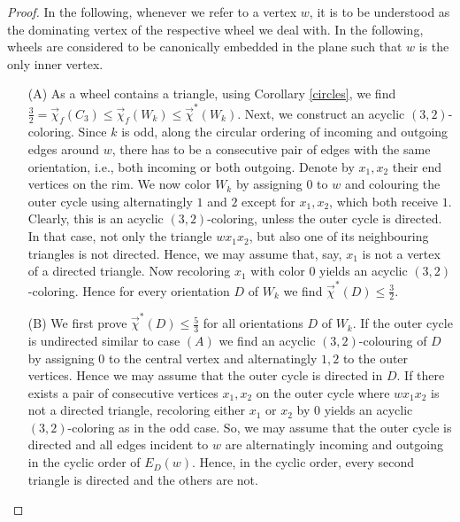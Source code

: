 \documentclass[fontsize=11pt,a4paper,DIV12]{scrartcl}
\theoremstyle{meiner}
\theoremstyle{definition}
\begin{document}
\begin{proof}
In the following, whenever we refer to a vertex $w$, it is to be understood as the dominating vertex of the respective wheel we deal with. In the following, wheels are considered to be canonically embedded in the plane such that $w$ is the only inner vertex. \par\noindent
\begin{itemize}
\item[(A)] As a wheel contains a triangle, using Corollary
  \ref{circles}, we find $\frac{3}{2}=\vec{\chi}_f(C_3) \leq
  \vec{\chi}_f(W_k) \leq \vec{\chi}^\ast(W_k).$ Next, we construct an
  acyclic $(3,2)$-coloring.  Since $k$ is odd, along the circular
  ordering of incoming and outgoing edges around $w$, there has to be
  a consecutive pair of edges with the same orientation, i.e., both
  incoming or both outgoing. Denote by $x_1,x_2$ their end vertices on
  the rim. We now color $W_k$ by assigning $0$ to $w$ and colouring
  the outer cycle using alternatingly $1$ and $2$ except for
  $x_1,x_2$, which both receive $1$. Clearly, this is an acyclic
  $(3,2)$-coloring, unless the outer cycle is directed. In that case,
  not only the triangle $wx_1x_2$, but also one of its neighbouring
  triangles is not directed. Hence, we may assume that, say, $x_1$ is
  not a vertex of a directed triangle. Now recoloring $x_1$ with color
  $0$ yields an acyclic $(3,2)$-coloring. Hence for every orientation
  $D$ of $W_k$ we find $\vec{\chi}^\ast(D) \leq \frac{3}{2}$.
\item[(B)] We first  prove  $\vec{\chi}^\ast(D) \leq \frac{5}{3}$  for
  all  orientations $D$ of  $W_k$. If  the  outer cycle is  undirected
  similar to case $(A)$ we find an acyclic $(3,2)$-colouring of $D$ by
  assigning $0$ to  the central vertex and  alternatingly $1,2$ to the
  outer vertices. Hence we may assume that the outer cycle is directed
  in $D$. If there exists a  pair of consecutive vertices $x_1,x_2$ on
  the    outer cycle where $wx_1x_2$   is   not  a directed  triangle,
  recoloring    either  $x_1$  or $x_2$  by    $0$   yields an acyclic
  $(3,2)$-coloring as  in the odd  case.  So, we   may assume that the
  outer  cycle is  directed  and   all   edges incident  to  $w$   are
  alternatingly incoming and outgoing in the cyclic order of $E_D(w)$.
  Hence, in  the cyclic order, every  second triangle is  directed and
  the others are not. 
%

\end{itemize}
\end{proof}
\end{document}
